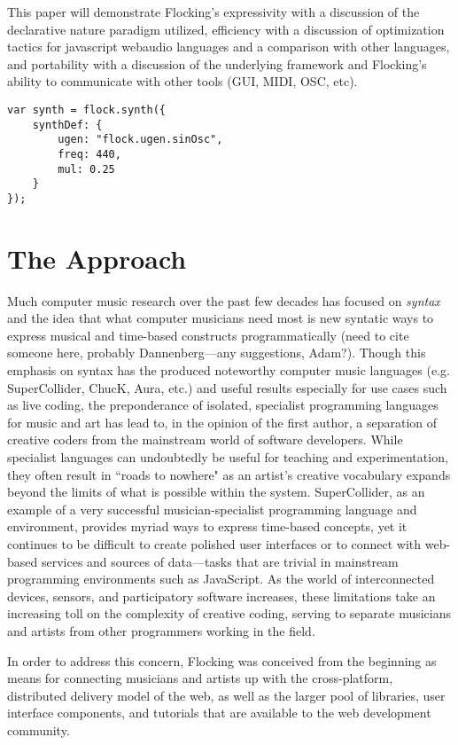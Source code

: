 \documentclass{article}
\begin{document}
This paper will demonstrate Flocking's expressivity with a discussion of the declarative nature paradigm utilized, efficiency with a discussion of optimization tactics for javascript webaudio languages and a comparison with other languages, and portability with a discussion of the underlying framework and Flocking's ability to communicate with other tools (GUI, MIDI, OSC, etc).


\begin{verbatim}
var synth = flock.synth({
    synthDef: {
        ugen: "flock.ugen.sinOsc",
        freq: 440,
        mul: 0.25
    }
});

\end{verbatim}

\section{The Approach}

Much computer music research over the past few decades has focused on {\it syntax} and the idea that what computer musicians need most is new syntatic ways to express musical and time-based constructs programmatically (need to cite someone here, probably Dannenberg---any suggestions, Adam?). Though this emphasis on syntax has the produced noteworthy computer music languages (e.g. SuperCollider, ChucK, Aura, etc.) and useful results especially for use cases such as live coding, the preponderance of isolated, specialist programming languages for music and art has lead to, in the opinion of the first author, a separation of creative coders from the mainstream world of software developers. While specialist languages can undoubtedly be useful for teaching and experimentation, they often result in ``roads to nowhere" as an artist's creative vocabulary expands beyond the limits of what is possible within the system. SuperCollider, as an example of a very successful musician-specialist programming language and environment, provides myriad ways to express time-based concepts, yet it continues to be difficult to create polished user interfaces or to connect with web-based services and sources of data---tasks that are trivial in mainstream programming environments such as JavaScript. As the world of interconnected devices, sensors, and participatory software increases, these limitations take an increasing toll on the complexity of creative coding, serving to separate musicians and artists from other programmers working in the field.

In order to address this concern, Flocking was conceived from the beginning as means for connecting musicians and artists up with the cross-platform, distributed delivery model of the web, as well as the larger pool of libraries, user interface components, and tutorials that are available to the web development community.
\end{document}
